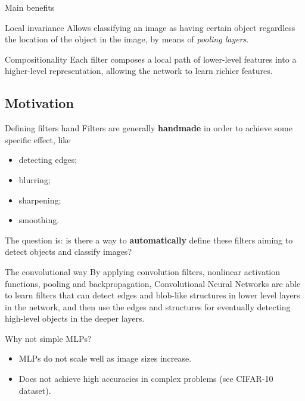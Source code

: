 \documentclass{beamer}
\begin{document}
    \begin{frame}{Main benefits}
        \begin{block}{Local invariance}
            Allows classifying an image as having certain
            object regardless the location of the object in the
            image, by means of \emph{pooling layers}.
        \end{block}

        \begin{block}{Compositionality}
            Each filter composes a local path of lower-level features
            into a higher-level representation, allowing
            the network to learn richier features.
        \end{block}
    \end{frame}

    \subsection{Motivation}
    \begin{frame}{Defining filters hand}
        Filters are generally \textbf{handmade} in order to achieve some
        specific effect, like

            \begin{itemize}
                \item detecting edges;
                \item blurring;
                \item sharpening;
                \item smoothing.
            \end{itemize}

        The question is: is there a way to \textbf{automatically} define these filters
        aiming to detect objects and classify images?
    \end{frame}

    \begin{frame}{The convolutional way}
        By applying convolution filters, nonlinear activation functions, pooling and backpropagation, Convolutional
        Neural Networks are able to learn filters that can detect edges and blob-like structures in lower level layers
        in the network, and then use the edges and structures for eventually detecting high-level objects
        in the deeper layers.

        \begin{block}{Why not simple MLPs?}
            \begin{itemize}
                \item MLPs do not scale well as image sizes increase.
                \item Does not achieve high accuracies in complex problems (see CIFAR-10 dataset).
            \end{itemize}
        \end{block}
    \end{frame}
\end{document}
